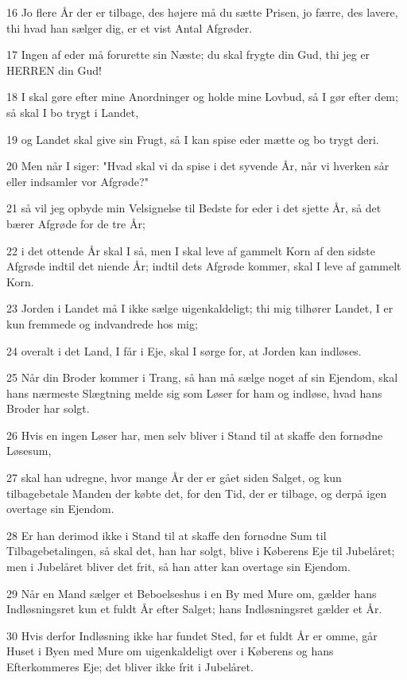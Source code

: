 \par 16 Jo flere År der er tilbage, des højere må du sætte Prisen, jo færre, des lavere, thi hvad han sælger dig, er et vist Antal Afgrøder.
\par 17 Ingen af eder må forurette sin Næste; du skal frygte din Gud, thi jeg er HERREN din Gud!
\par 18 I skal gøre efter mine Anordninger og holde mine Lovbud, så I gør efter dem; så skal I bo trygt i Landet,
\par 19 og Landet skal give sin Frugt, så I kan spise eder mætte og bo trygt deri.
\par 20 Men når I siger: "Hvad skal vi da spise i det syvende År, når vi hverken sår eller indsamler vor Afgrøde?"
\par 21 så vil jeg opbyde min Velsignelse til Bedste for eder i det sjette År, så det bærer Afgrøde for de tre År;
\par 22 i det ottende År skal I så, men I skal leve af gammelt Korn af den sidste Afgrøde indtil det niende År; indtil dets Afgrøde kommer, skal I leve af gammelt Korn.
\par 23 Jorden i Landet må I ikke sælge uigenkaldeligt; thi mig tilhører Landet, I er kun fremmede og indvandrede hos mig;
\par 24 overalt i det Land, I får i Eje, skal I sørge for, at Jorden kan indløses.
\par 25 Når din Broder kommer i Trang, så han må sælge noget af sin Ejendom, skal hans nærmeste Slægtning melde sig som Løser for ham og indløse, hvad hans Broder har solgt.
\par 26 Hvis en ingen Løser har, men selv bliver i Stand til at skaffe den fornødne Løsesum,
\par 27 skal han udregne, hvor mange År der er gået siden Salget, og kun tilbagebetale Manden der købte det, for den Tid, der er tilbage, og derpå igen overtage sin Ejendom.
\par 28 Er han derimod ikke i Stand til at skaffe den fornødne Sum til Tilbagebetalingen, så skal det, han har solgt, blive i Køberens Eje til Jubelåret; men i Jubelåret bliver det frit, så han atter kan overtage sin Ejendom.
\par 29 Når en Mand sælger et Beboelseshus i en By med Mure om, gælder hans Indløsningsret kun et fuldt År efter Salget; hans Indløsningsret gælder et År.
\par 30 Hvis derfor Indløsning ikke har fundet Sted, før et fuldt År er omme, går Huset i Byen med Mure om uigenkaldeligt over i Køberens og hans Efterkommeres Eje; det bliver ikke frit i Jubelåret.
